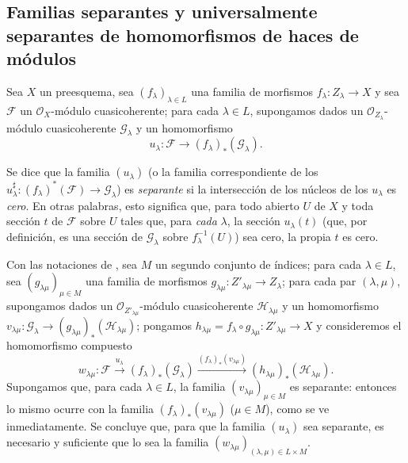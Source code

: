 \subsection{Familias separantes y universalmente separantes de homomorfismos de haces de módulos}
\label{subsection:IV.11.9}

\begin{env}[11.9.1]
\label{IV.11.9.1}
Sea $X$ un preesquema, sea $(f_{\lambda})_{\lambda\in L}$ una familia de morfismos $f_{\lambda}:Z_{\lambda}\to X$ y sea $\mathcal F$ un $\mathcal O_X$-módulo cuasicoherente; para cada $\lambda\in L$, supongamos dados un $\mathcal O_{Z_{\lambda}}$-módulo cuasicoherente $\mathcal G_{\lambda}$ y un homomorfismo
\begin{equation}
u_{\lambda}:\mathcal F\longrightarrow(f_{\lambda})_*(\mathcal G_{\lambda}).
\label{IV.11.9.1.1-fr}
\tag{11.9.1.1}
\end{equation}
\end{env}

Se dice que la familia $(u_\lambda)$ (o la familia correspondiente de los $u^\sharp_\lambda:(f_\lambda)^*(\mathcal F)\to\mathcal G_\lambda$) es \emph{separante} si la intersección de los núcleos de los $u_\lambda$ es \emph{cero}.
En otras palabras, esto significa que, para todo abierto $U$ de $X$ y toda sección $t$ de $\mathcal F$ sobre $U$ tales que, para \emph{cada} $\lambda$, la sección $u_\lambda(t)$ (que, por definición, es una sección de $\mathcal G_\lambda$ sobre $f_\lambda^{-1}(U)$) sea cero, la propia $t$ es cero.

\begin{env}[11.9.2]
\label{IV.11.9.2}
Con las notaciones de , sea $M$ un segundo conjunto de índices; para cada $\lambda\in L$, sea $(g_{\lambda\mu})_{\mu\in M}$ una familia de morfismos $g_{\lambda\mu}:Z'_{\lambda\mu}\to Z_\lambda$; para cada par $(\lambda,\mu)$, supongamos dados un $\mathcal O_{Z'_{\lambda\mu}}$-módulo cuasicoherente $\mathcal H_{\lambda\mu}$ y un homomorfismo $v_{\lambda\mu}:\mathcal G_\lambda\to
(g_{\lambda\mu})_*(\mathcal H_{\lambda\mu})$; pongamos $h_{\lambda\mu}=f_\lambda\circ g_{\lambda\mu}:Z'_{\lambda\mu}\to X$ y consideremos el homomorfismo compuesto
\[
w_{\lambda\mu}:\mathcal F\xrightarrow{u_\lambda}
(f_\lambda)_*(\mathcal G_\lambda)
\xrightarrow{(f_\lambda)_*(v_{\lambda\mu})}
(h_{\lambda\mu})_*(\mathcal H_{\lambda\mu}).
\]
Supongamos que, para cada $\lambda\in L$, la familia $(v_{\lambda\mu})_{\mu\in M}$ es separante: entonces lo mismo ocurre con la familia $(f_\lambda)_*(v_{\lambda\mu})$ ($\mu\in M$), como se ve inmediatamente.
Se concluye que, para que la familia $(u_\lambda)$ sea separante, es necesario y suficiente que lo sea la familia $(w_{\lambda\mu})_{(\lambda,\mu)\in L\times M}$.
\end{env}

